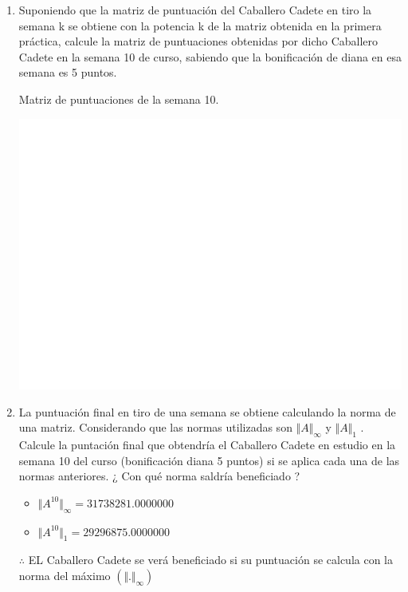\documentclass[12pt,a4paper]{article}
\begin{document}
\begin{enumerate}
	\item Suponiendo que la matriz de puntuación del Caballero Cadete en tiro la semana k se obtiene con la potencia k de la matriz obtenida en la primera práctica, calcule la matriz de puntuaciones obtenidas por dicho Caballero Cadete en la semana 10 de curso, sabiendo que la bonificación de diana en esa semana es 5 puntos.
	
	Matriz de puntuaciones de la semana  10.
	\begin{center}
		\includegraphics[page=3,trim= 4.3cm 4cm 4cm 4cm, clip, scale=0.75]{MatrixSimb}
	\end{center}
	
	\item La puntuación final en tiro de una semana se obtiene calculando la norma de una matriz. Considerando que las normas utilizadas son $\Vert A\Vert_{\infty}$ y $\Vert A\Vert_{1}$ . Calcule la puntación final que obtendría el Caballero Cadete en estudio en la semana 10 del curso (bonificación diana 5 puntos) si se aplica cada una de las normas anteriores. ¿ Con qué norma saldría beneficiado ?
		\begin{itemize}
			\item $\Vert A^{10}\Vert_{\infty} = 31738281.0000000$
			\item $\Vert A^{10}\Vert_{1} = 29296875.0000000$
		\end{itemize}
		$\therefore$ EL Caballero Cadete se verá beneficiado si su puntuación se calcula con la norma del máximo $(\Vert .\Vert_{\infty})$
\end{enumerate}
\end{document}
